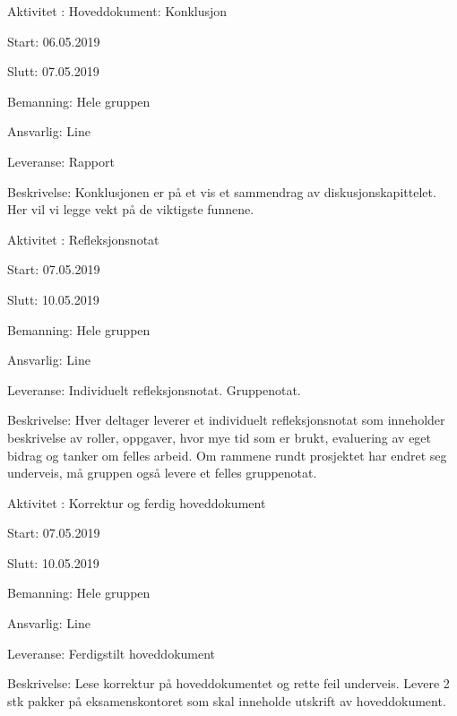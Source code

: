 \documentclass[11pt,a4paper]{report}
\begin{document}
\begin{compactdesc}
	\item [Aktivitet \arabic{aktivitetTeller}:] Hoveddokument: Konklusjon
	\begin{compactitem}
	\item Start: 06.05.2019
	\item Slutt: 07.05.2019
	\item Bemanning: Hele gruppen
	\item Ansvarlig: Line
	\item Leveranse: Rapport
	\item Beskrivelse: Konklusjonen er på et vis et sammendrag av diskusjonskapittelet. Her vil vi legge vekt på de viktigste funnene.
	\addtocounter{aktivitetTeller}{1}
	\end{compactitem}
	
	\item [Aktivitet \arabic{aktivitetTeller}:] Refleksjonsnotat
	\begin{compactitem}
	\item Start: 07.05.2019
	\item Slutt: 10.05.2019
	\item Bemanning: Hele gruppen
	\item Ansvarlig: Line
	\item Leveranse: Individuelt refleksjonsnotat. Gruppenotat.
	\item Beskrivelse: Hver deltager leverer et individuelt refleksjonsnotat som inneholder beskrivelse av roller, oppgaver, hvor mye tid som er brukt, evaluering av eget bidrag og tanker om felles arbeid. Om rammene rundt prosjektet har endret seg underveis, må gruppen også levere et felles gruppenotat.
	\addtocounter{aktivitetTeller}{1}
	\end{compactitem}
	
	\item [Aktivitet \arabic{aktivitetTeller}:] Korrektur og ferdig hoveddokument
	\begin{compactitem}
	\item Start: 07.05.2019
	\item Slutt: 10.05.2019
	\item Bemanning: Hele gruppen
	\item Ansvarlig: Line
	\item Leveranse: Ferdigstilt hoveddokument
	\item Beskrivelse: Lese korrektur på hoveddokumentet og rette feil underveis. Levere 2 stk pakker på eksamenskontoret som skal inneholde utskrift av hoveddokument.
	\addtocounter{aktivitetTeller}{1}
	\end{compactitem}
	

\end{compactdesc}
\end{document}
